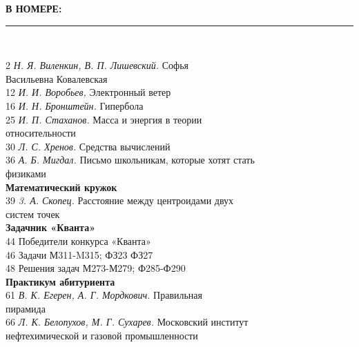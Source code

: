 \begin{spacing}{0.5}
\hspace*{-1ex}\textbf{В НОМЕРЕ:}\\
\hspace*{3ex}\rule{9.5cm}{0.4pt}\\
\end{spacing}
\hspace*{-2ex}2 \textit{Н. Я. Виленкин, В. П. Лишевский.} Софья\\
\hspace*{3ex}Васильевна Ковалевская\\
12 \textit{И. И. Воробьев,} Электронный ветер\\
16 \textit{И. Н. Бронштейн.} Гипербола\\
25 \textit{И. П. Стаханов.} Масса и энергия в теории\\
\hspace*{3ex}относительности\\
30 \textit{Л. С. Хренов.} Средства вычислений\\
36 \textit{А. Б. Мигдал.} Письмо школьникам, которые хотят стать\\
\hspace*{3ex}физиками\\
\newline
\hspace*{3ex}\textbf{Математический кружок}\\
39 \textit{3. А. Скопец.} Расстояние между центроидами двух\\
\hspace*{3ex}систем точек\\
\newline
\hspace*{3ex}\textbf{Задачник «Кванта»}\\
44 Победители конкурса «Кванта»\\
46 Задачи М311-M315; ФЗ23 ФЗ27\\
48 Решения задач М273-М279; Ф285-Ф290\\
\newline
\hspace*{3ex}\textbf{Практикум абитуриента}\\
61 \textit{В. К. Егерен, А. Г. Мордкович.} Правильная\\
\hspace*{3ex}пирамида\\
66 \textit{Л. К. Белопухов, М. Г. Сухарев.} Московский институт\\
\hspace*{3ex}нефтехимической и газовой промышленности\\
